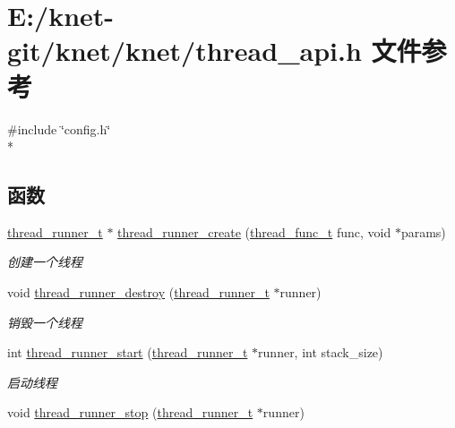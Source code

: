 \hypertarget{a00094}{}\section{E\+:/knet-\/git/knet/knet/thread\+\_\+api.h 文件参考}
\label{a00094}
{\ttfamily \#include \char`\"{}config.\+h\char`\"{}}\\*
\subsection*{函数}
\begin{DoxyCompactItemize}
\item 
\hyperlink{a00051_a9054159cde2f926ef61c28ce1e555199_a9054159cde2f926ef61c28ce1e555199}{thread\+\_\+runner\+\_\+t} $\ast$ \hyperlink{a00109_gac20d7726e152e0b49209ce228893c25d_gac20d7726e152e0b49209ce228893c25d}{thread\+\_\+runner\+\_\+create} (\hyperlink{a00051_a46bcd8005e5d86fdbc6be5af0a77156c_a46bcd8005e5d86fdbc6be5af0a77156c}{thread\+\_\+func\+\_\+t} func, void $\ast$params)
\begin{DoxyCompactList}\small\item\em 创建一个线程 \end{DoxyCompactList}\item 
void \hyperlink{a00109_ga8b9d3d45b6055971fc40f24ec6572cf6_ga8b9d3d45b6055971fc40f24ec6572cf6}{thread\+\_\+runner\+\_\+destroy} (\hyperlink{a00051_a9054159cde2f926ef61c28ce1e555199_a9054159cde2f926ef61c28ce1e555199}{thread\+\_\+runner\+\_\+t} $\ast$runner)
\begin{DoxyCompactList}\small\item\em 销毁一个线程 \end{DoxyCompactList}\item 
int \hyperlink{a00109_ga1114fd962e310f9d31ed4e83d8a21897_ga1114fd962e310f9d31ed4e83d8a21897}{thread\+\_\+runner\+\_\+start} (\hyperlink{a00051_a9054159cde2f926ef61c28ce1e555199_a9054159cde2f926ef61c28ce1e555199}{thread\+\_\+runner\+\_\+t} $\ast$runner, int stack\+\_\+size)
\begin{DoxyCompactList}\small\item\em 启动线程 \end{DoxyCompactList}\item 
void \hyperlink{a00109_gaa035f190ffd3d7f117b8fbb58716f042_gaa035f190ffd3d7f117b8fbb58716f042}{thread\+\_\+runner\+\_\+stop} (\hyperlink{a00051_a9054159cde2f926ef61c28ce1e555199_a9054159cde2f926ef61c28ce1e555199}{thread\+\_\+runner\+\_\+t} $\ast$runner)

\end{DoxyCompactItemize}
